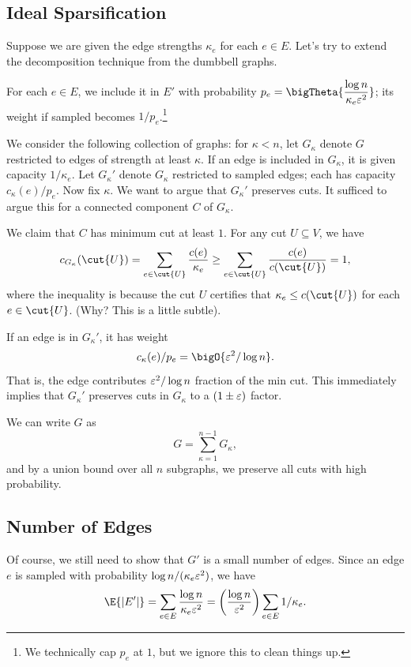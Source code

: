 \documentclass[12pt]{article}
\begin{document}
\subsection{Ideal Sparsification}

Suppose we are given the edge strengths $\kappa_e$ for each $e \in E$. Let's try
to extend the decomposition technique from the dumbbell graphs.

For each $e \in E$, we include it in $E'$ with probability
$p_e = \bigTheta{\dfrac{\log n}{\kappa_e\eps^2}}$; its weight if sampled becomes
$1/p_e$.\footnote{We technically cap $p_e$ at $1$, but we ignore this to clean
things up.}

We consider the following collection of graphs: for $\kappa < n$, let $G_\kappa$
denote $G$ restricted to edges of strength at least $\kappa$. If an edge is
included in $G_\kappa$, it is given capacity $1/\kappa_e$. Let $G_\kappa'$
denote $G_\kappa$ restricted to sampled edges; each has capacity
$c_\kappa(e)/p_e$. Now fix $\kappa$. We want to argue that $G_\kappa'$ preserves
cuts. It sufficed to argue this for a connected component $C$ of $G_\kappa$.

We claim that $C$ has minimum cut at least $1$. For any cut $U \subseteq V$, we
have
\begin{align*}
  c_{G_\kappa}(\cut{U}) =    \sum_{e \in \cut{U}}\frac{c(e)}{\kappa_e}
                        \geq \sum_{e \in \cut{U}} \frac{c(e)}{c(\cut{U})}
                        =    1,
\end{align*}
where the inequality is because the cut $U$ certifies that
$\kappa_e \leq c(\cut{U})$ for each $e \in \cut{U}$. (Why? This is a little
subtle).

If an edge is in $G_\kappa'$, it has weight
\[
  c_\kappa(e)/p_e = \bigO{\eps^2/\log n}.
\]
That is, the edge contributes $\varepsilon^2/\log n$ fraction of the min cut. This
immediately implies that $G_\kappa'$ preserves cuts in $G_\kappa$ to a
$(1 \pm \varepsilon)$ factor.

We can write $G$ as
\[
  G = \sum_{\kappa=1}^{n-1} G_\kappa,
\]
and by a union bound over all $n$ subgraphs, we preserve all cuts with high
probability.

\subsection{Number of Edges}

Of course, we still need to show that $G'$ is a small number of edges. Since an
edge $e$ is sampled with probability $\log n / (\kappa_e \varepsilon^2)$, we have
\[
  \E{\sizeof{E'}} = \sum_{e \in E} \frac{\log n}{\kappa_e \eps^2}
                  = \prac{\log
    n}{\eps^2}\sum_{e \in E} 1/\kappa_e.
\]
\end{document}
